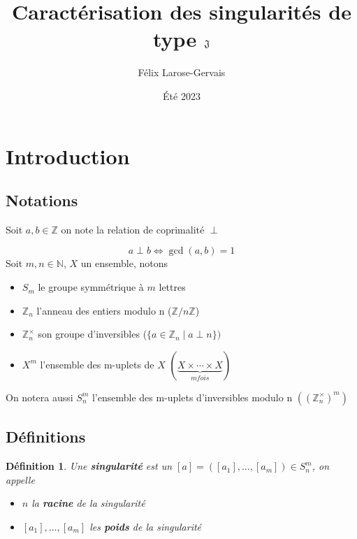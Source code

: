 \documentclass{article}
\title{Caractérisation des singularités de type $\mathfrak{J}$}
\author{Félix Larose-Gervais}
\date{Été 2023}
\newtheorem{definition}{Définition}
\begin{document}
\maketitle

\tableofcontents

\newpage

\section{Introduction}

\subsection{Notations}

Soit $a, b \in \mathbb{Z}$ on note la relation de coprimalité $\perp$

\[ a \perp b \iff \gcd(a, b) = 1 \]
Soit $m, n \in \mathbb{N}$, $X$ un ensemble, notons 

\begin{itemize}
    \item $S_m$ le groupe symmétrique à $m$ lettres
    \item $\mathbb{Z}_n$ l'anneau des entiers modulo n ($\mathbb{Z}/n\mathbb{Z}$)
    \item $\mathbb{Z}_n^\times$ son groupe d'inversibles ($\{ a \in \mathbb{Z}_n \mid a \perp n \})$
    \item $X^m$ l'ensemble des m-uplets de $X$ $(\underbrace{X \times \cdots \times X}_{m fois})$
\end{itemize}
On notera aussi $S_n^m$ l'ensemble des m-uplets d'inversibles modulo n $({({\mathbb{Z}_n^\times})}^m)$

\subsection{Définitions}

\begin{definition}
    Une \textbf{singularité} est un $[a] = ([a_1], \dots, [a_m]) \in S_n^m$, on appelle \begin{itemize}
        \item $n$ la \textbf{racine} de la singularité
        \item $[a_1], \dots, [a_m]$ les \textbf{poids} de la singularité
    \end{itemize}
\end{definition}
\end{document}
